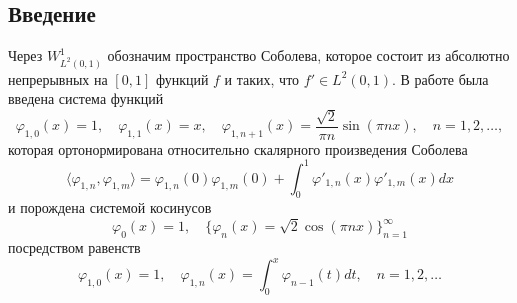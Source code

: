 \subsection{Введение}

Через $W^1_{L^2(0,1)}$ обозначим пространство Соболева, которое состоит из абсолютно непрерывных на $[0,1]$ функций $f$ и таких, что $f{'}\in L^2(0,1)$.
В работе \cite{RamShaMag} была введена система функций
\begin{equation}\label{GasRam-eq1}
 \varphi_{1,0}(x)=1,\quad \varphi_{1,1}(x)=x,\quad \varphi_{1,n+1}(x)=\frac{\sqrt{2}}{\pi n}\sin(\pi nx),\quad n=1,2,\ldots,
\end{equation}
которая ортонормирована относительно скалярного произведения Соболева
\begin{equation*}
\langle\varphi_{1,n},\varphi_{1,m}\rangle=\varphi_{1,n}(0)\varphi_{1,m}(0)+\int_0^1\varphi'_{1,n}(x)\varphi'_{1,m}(x)dx
\end{equation*}
и порождена системой косинусов
\begin{equation}\label{GasRam-eq2}
\varphi_0(x)=1,\quad \{\varphi_n(x)=\sqrt{2}\cos(\pi nx)\}_{n=1}^\infty
\end{equation}
посредством равенств
$$
 \varphi_{1,0}(x)=1,\quad \varphi_{1,n}(x)=\int_0^x \varphi_{n-1}(t)dt, \quad n=1,2,\ldots
$$

